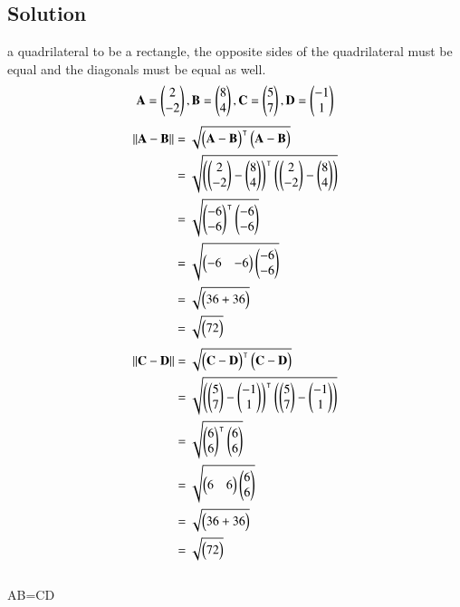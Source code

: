 \documentclass[journal,12pt,twocolumn]{IEEEtran}
\begin{document}
\subsection{Solution}
 a quadrilateral to be a rectangle, the opposite sides of the quadrilateral must be equal and the diagonals must be equal as well.
\begin{align}
\vec{A} = \myvec{2\\-2 },
\vec{B} = \myvec{8\\4 },
\vec{C} = \myvec{5\\7},
\vec{D} = \myvec{-1\\1}
\end{align}
\begin{align}
\norm{\vec{A}-\vec{B}}&= \sqrt{\myvec{\vec{A}-\vec{B}}^\intercal\myvec{\vec{A}-\vec{B}}}\\
&=\sqrt{\myvec{\myvec{2\\-2}-\myvec{8\\4}}^\intercal\myvec{\myvec{2\\-2}-\myvec{8\\4}}}\\
&=\sqrt{\myvec{-6\\-6}^\intercal\myvec{-6\\-6}} \\
&=\sqrt{\myvec{-6 & -6}\myvec{-6\\-6}} \\
&=\sqrt{\myvec{36+36}}  \nonumber \\
&= \sqrt{\myvec{72}}\nonumber 
\end{align}
\begin{align}
\norm{\vec{C}-\vec{D}}&= \sqrt{\myvec{\vec{C}-\vec{D}}^\intercal\myvec{\vec{C}-\vec{D}}}\\
&=\sqrt{\myvec{\myvec{5\\7}-\myvec{-1\\1}}^\intercal\myvec{\myvec{5\\7}-\myvec{-1\\1}}}\\
&=\sqrt{\myvec{6\\6}^\intercal\myvec{6\\6}} \\
&=\sqrt{\myvec{6 & 6}\myvec{6\\6}} \\
&=\sqrt{\myvec{36+36}}  \nonumber \\
&= \sqrt{\myvec{72}}\nonumber 
\end{align}
\\
AB=CD\\
\end{document}
